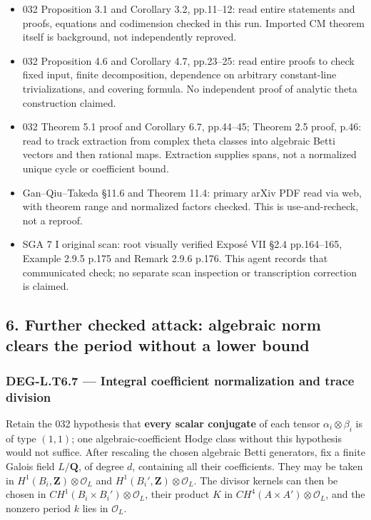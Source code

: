 \documentclass[11pt,a4paper]{article}
\providecommand{\tightlist}{\setlength{\itemsep}{0pt}\setlength{\parskip}{0pt}}
\theoremstyle{definition}
\begin{document}
\begin{itemize}
\tightlist
\item
  032 Proposition 3.1 and Corollary 3.2, pp.11--12: read entire statements and proofs, equations and codimension checked in this run. Imported CM theorem itself is background, not independently reproved.
\item
  032 Proposition 4.6 and Corollary 4.7, pp.23--25: read entire proofs to check fixed input, finite decomposition, dependence on arbitrary constant-line trivializations, and covering formula. No independent proof of analytic theta construction claimed.
\item
  032 Theorem 5.1 proof and Corollary 6.7, pp.44--45; Theorem 2.5 proof, p.46: read to track extraction from complex theta classes into algebraic Betti vectors and then rational maps. Extraction supplies spans, not a normalized unique cycle or coefficient bound.
\item
  Gan--Qiu--Takeda §11.6 and Theorem 11.4: primary arXiv PDF read via web, with theorem range and normalized factors checked. This is use-and-recheck, not a reproof.
\item
  SGA 7 I original scan: root visually verified Exposé VII §2.4 pp.164--165, Example 2.9.5 p.175 and Remark 2.9.6 p.176. This agent records that communicated check; no separate scan inspection or transcription correction is claimed.
\end{itemize}

\subsection{6. Further checked attack: algebraic norm clears the period without a lower bound}\label{further-checked-attack-algebraic-norm-clears-the-period-without-a-lower-bound}

\subsubsection{DEG-L.T6.7 --- Integral coefficient normalization and trace division}\label{DEG-L.T6.7}

Retain the 032 hypothesis that \textbf{every scalar conjugate} of each tensor \(\alpha_i\otimes\beta_i\) is of type \((1,1)\); one algebraic-coefficient Hodge class without this hypothesis would not suffice. After rescaling the chosen algebraic Betti generators, fix a finite Galois field \(L/\mathbf Q\), of degree \(d\), containing all their coefficients. They may be taken in \(H^1(B_i,\mathbf Z)\otimes\mathcal O_L\) and \(H^1(B_i',\mathbf Z)\otimes\mathcal O_L\). The divisor kernels can then be chosen in \(CH^1(B_i\times B_i')\otimes\mathcal O_L\), their product \(K\) in \(CH^4(A\times A')\otimes\mathcal O_L\), and the nonzero period \(k\) lies in \(\mathcal O_L\).
\end{document}
